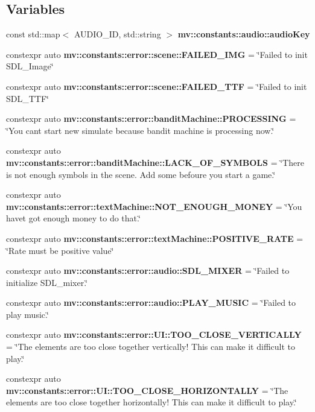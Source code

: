 \subsection*{Variables}
\begin{DoxyCompactItemize}
\item 
const std\+::map$<$ A\+U\+D\+I\+O\+\_\+\+ID, std\+::string $>$ \textbf{ mv\+::constants\+::audio\+::audio\+Key}
\item 
constexpr auto \textbf{ mv\+::constants\+::error\+::scene\+::\+F\+A\+I\+L\+E\+D\+\_\+\+I\+MG} = \char`\"{}Failed to init S\+D\+L\+\_\+\+Image\char`\"{}
\item 
constexpr auto \textbf{ mv\+::constants\+::error\+::scene\+::\+F\+A\+I\+L\+E\+D\+\_\+\+T\+TF} = \char`\"{}Failed to init S\+D\+L\+\_\+\+T\+TF\char`\"{}
\item 
constexpr auto \textbf{ mv\+::constants\+::error\+::bandit\+Machine\+::\+P\+R\+O\+C\+E\+S\+S\+I\+NG} = \char`\"{}You can\textquotesingle{}t start new simulate because bandit machine is processing now.\char`\"{}
\item 
constexpr auto \textbf{ mv\+::constants\+::error\+::bandit\+Machine\+::\+L\+A\+C\+K\+\_\+\+O\+F\+\_\+\+S\+Y\+M\+B\+O\+LS} = \char`\"{}There is not enough symbols in the scene. Add some befoure you start a game.\char`\"{}
\item 
constexpr auto \textbf{ mv\+::constants\+::error\+::text\+Machine\+::\+N\+O\+T\+\_\+\+E\+N\+O\+U\+G\+H\+\_\+\+M\+O\+N\+EY} = \char`\"{}You have\textquotesingle{}t got enough money to do that.\char`\"{}
\item 
constexpr auto \textbf{ mv\+::constants\+::error\+::text\+Machine\+::\+P\+O\+S\+I\+T\+I\+V\+E\+\_\+\+R\+A\+TE} = \char`\"{}Rate must be positive value\char`\"{}
\item 
constexpr auto \textbf{ mv\+::constants\+::error\+::audio\+::\+S\+D\+L\+\_\+\+M\+I\+X\+ER} = \char`\"{}Failed to initialize S\+D\+L\+\_\+mixer.\char`\"{}
\item 
constexpr auto \textbf{ mv\+::constants\+::error\+::audio\+::\+P\+L\+A\+Y\+\_\+\+M\+U\+S\+IC} = \char`\"{}Failed to play music.\char`\"{}
\item 
constexpr auto \textbf{ mv\+::constants\+::error\+::\+U\+I\+::\+T\+O\+O\+\_\+\+C\+L\+O\+S\+E\+\_\+\+V\+E\+R\+T\+I\+C\+A\+L\+LY} = \char`\"{}The elements are too close together vertically! This can make it difficult to play.\char`\"{}
\item 
constexpr auto \textbf{ mv\+::constants\+::error\+::\+U\+I\+::\+T\+O\+O\+\_\+\+C\+L\+O\+S\+E\+\_\+\+H\+O\+R\+I\+Z\+O\+N\+T\+A\+L\+LY} = \char`\"{}The elements are too close together horizontally! This can make it difficult to play.\char`\"{}

\end{DoxyCompactItemize}
